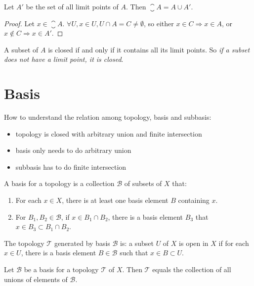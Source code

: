 \begin{theorem}
    Let $A'$ be the set of all limit points of $A$. Then $\closure{A} = A \cup A'$.
\end{theorem}
\begin{proof}
    Let $x \in \closure{A}$. $\forall U, x \in U, U \cap A = C \neq \emptyset$, so either $x \in C \Rightarrow x \in A$, or $x \notin C \Rightarrow x \in A'$.
\end{proof}

\begin{theorem}
A subset of $A$ is closed if and only if it contains all its limit points. So \emph{if a subset does not have a limit point, it is closed}.
\end{theorem}


\section{Basis}



How to understand the relation among topology, basis and subbasis:
\begin{itemize}
    \item topology is closed with arbitrary union and finite intersection
    \item basis only needs to do arbitrary union
    \item subbasis has to do finite intersection
\end{itemize}



\begin{definition}
    A basis for a topology is a collection $\mathcal{B}$ of subsets of $X$ that:
    \begin{enumerate}
        \item For each $x \in X$, there is at least one basis element $B$ containing $x$.
        \item For $B_1, B_2 \in \mathcal{B}$, if $x \in B_1 \cap B_2$, there is a basis element $B_3$ that $x \in B_3 \subset B_1 \cap B_2$.
    \end{enumerate}
\end{definition}

The topology $\mathcal{T}$ generated by basis $\mathcal{B}$ is: a subset $U$ of $X$ is open in $X$ if for each $x \in U$, there is a basis element $B \in \mathcal{B}$ such that $x \in B \subset U$.




\begin{theorem}
    Let $\mathcal{B}$ be a basis for a topology $\mathcal{T}$ of $X$. Then $\mathcal{T}$ equals the collection of all unions of elements of $\mathcal{B}$.
\end{theorem}



